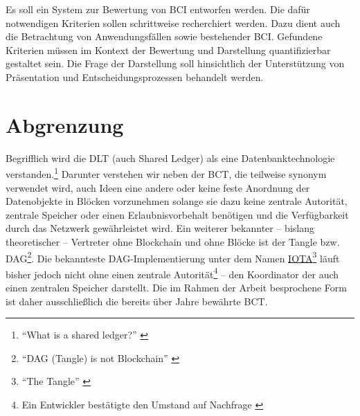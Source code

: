Es soll ein System zur Bewertung von \gls{BCI} entworfen werden.
Die dafür notwendigen Kriterien sollen schrittweise recherchiert werden.
Dazu dient auch die Betrachtung von Anwendungsfällen sowie bestehender \gls{BCI}.
Gefundene Kriterien müssen im Kontext der Bewertung und Darstellung quantifizierbar gestaltet sein.
Die Frage der Darstellung soll hinsichtlich der Unterstützung von Präsentation und Entscheidungsprozessen behandelt werden.


\section{Abgrenzung}\label{sec:abgrenzung}

Begrifflich wird die \gls{DLT} (auch Shared Ledger) als eine Datenbanktechnologie verstanden.\footnote{\enquote{What is a shared ledger?} \autocite{b:gos-dlt}}
Darunter verstehen wir neben der \gls{BCT}, die teilweise synonym verwendet wird, auch Ideen eine andere oder keine feste Anordnung der Datenobjekte in Blöcken vorzunehmen solange sie dazu keine zentrale Autorität, zentrale Speicher oder einen Erlaubnisvorbehalt benötigen und die Verfügbarkeit durch das Netzwerk gewährleistet wird.
Ein weiterer bekannter -- bislang theoretischer -- Vertreter ohne Blockchain und ohne Blöcke ist der Tangle bzw. \gls{DAG}\footnote{\enquote{DAG (Tangle) is not Blockchain} \autocite{w:satoshiwatch-dag}}.
Die bekannteste \gls{DAG}-Implementierung unter dem Namen \href{https://iota.org/}{IOTA}\footnote{\enquote{The Tangle} \autocite{p:iota}} läuft bisher jedoch nicht ohne einen zentrale Autorität\footnote{Ein Entwickler bestätigte den Umstand auf Nachfrage \autocite{w:iota-centralized}} -- den Koordinator der auch einen zentralen Speicher darstellt.
Die im Rahmen der Arbeit besprochene Form ist daher ausschließlich die bereits über Jahre bewährte \gls{BCT}.

